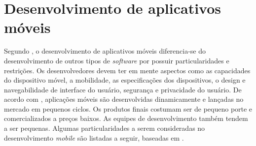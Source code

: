 \chapter{Desenvolvimento de aplicativos móveis} \label{cap:referencialteorico} 

Segundo , o desenvolvimento de aplicativos móveis diferencia-se do desenvolvimento de outros tipos de \textit{software} por possuir particularidades e restrições. Os desenvolvedores devem 
ter em mente aspectos como as capacidades do dispositivo móvel, a mobilidade, as especificações dos dispositivos, o design e navegabilidade de interface do usuário, segurança e privacidade do usuário. 
De acordo com , aplicações móveis  são desenvolvidas dinamicamente e lançadas no mercado em pequenos ciclos. Os produtos finais costumam ser de pequeno porte e comercializados a preços baixos. 
As equipes de desenvolvimento também tendem a ser pequenas. Algumas particularidades a serem consideradas no desenvolvimento \textit{mobile} são listadas a seguir, baseadas em .

